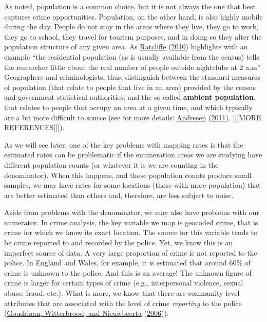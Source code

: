 \documentclass[
]{book}
\begin{document}
As noted, population is a common choice, but it is not always the one that best captures crime opportunities. Population, on the other hand, is also highly mobile during the day. People do not stay in the areas where they live, they go to work, they go to school, they travel for tourism purposes, and in doing so they alter the population structure of any given area. As \protect\hyperlink{ref-Ratcliffe_2010}{Ratcliffe} (\protect\hyperlink{ref-Ratcliffe_2010}{2010}) highlights with an example ``the residential population (as is usually available from the census) tells the researcher little about the real number of people outside nightclubs at 2 a.m'' Geographers and criminologists, thus, distinguish between the standard measures of population (that relate to people that live in an area) provided by the census and government statistical authorities; and the so called \textbf{ambient population}, that relates to people that occupy an area at a given time, and which typically are a bit more difficult to source (see for more details: \protect\hyperlink{ref-Andresen_2011}{Andresen} (\protect\hyperlink{ref-Andresen_2011}{2011}), {[}{[}{[}MORE REFERENCES{]}{]}{]}).

As we will see later, one of the key problems with mapping rates is that the estimated rates can be problematic if the enumeration areas we are studying have different population counts (or whatever it is we are counting in the denominator). When this happens, and those population counts produce small samples, we may have rates for some locations (those with more population) that are better estimated than others and, therefore, are less subject to noise.

Aside from problems with the denominator, we may also have problems with our numerator. In crime analysis, the key variable we map is geocoded crime, that is crime for which we know its exact location. The source for this variable tends to be crime reported to and recorded by the police. Yet, we know this is an imperfect source of data. A very large proportion of crime is not reported to the police. In England and Wales, for example, it is estimated that around 60\% of crime is unknown to the police. And this is an average! The unknown figure of crime is larger for certain types of crime (e.g., interpersonal violence, sexual abuse, fraud, etc.). What is more, we know that there are community-level attributes that are associated with the level of crime \emph{reporting} to the police (\protect\hyperlink{ref-Goudriaan_2006}{Goudriaan, Witterbrood, and Nieuwbeerta} (\protect\hyperlink{ref-Goudriaan_2006}{2006})).
\end{document}
